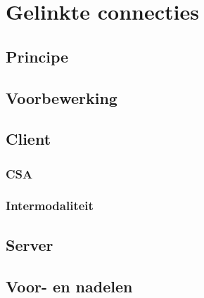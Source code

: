 
\chapter{Gelinkte connecties}

\section{Principe}

\section{Voorbewerking}

\section{Client}

\subsection{CSA}

\subsection{Intermodaliteit}

\section{Server}

\section{Voor- en nadelen}